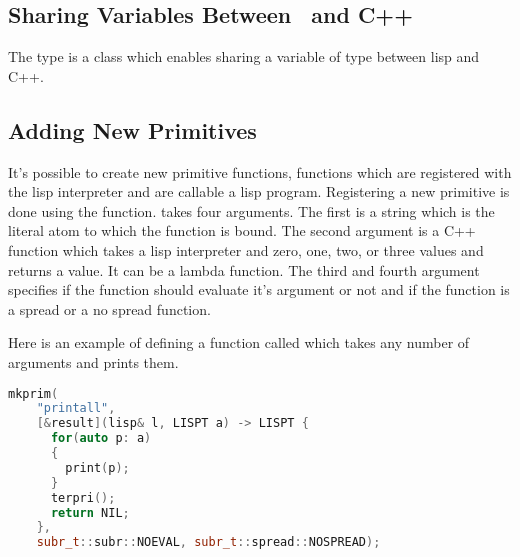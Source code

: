 \subsection{Sharing Variables Between \lips\ and \textsf{C++}}
The type  is a class which enables sharing a
variable of type  between lisp and \textsf{C++}.

\subsection{Adding New Primitives}
It's possible to create new primitive functions, functions which are
registered with the lisp interpreter and are callable a lisp
program. Registering a new primitive is done using the
 function.  takes four
arguments. The first is a string which is the literal atom to which
the function is bound. The second argument is a \textsf{C++} function
which takes a lisp interpreter and zero, one, two, or three
 values and returns a  value. It can be a lambda
function.  The third and fourth argument specifies if the function
should evaluate it's argument or not and if the function is a spread
or a no spread function.

Here is an example of defining a function called  which
takes any number of arguments and prints them.

\begin{lstlisting}[language=c++]
  mkprim(
    "printall",
    [&result](lisp& l, LISPT a) -> LISPT {
      for(auto p: a)
      {
        print(p);
      }
      terpri();
      return NIL;
    },
    subr_t::subr::NOEVAL, subr_t::spread::NOSPREAD);
\end{lstlisting}
